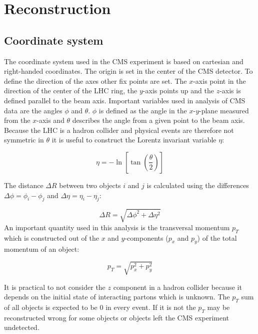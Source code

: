 \section{Reconstruction}
\subsection{Coordinate system}
	The coordinate system used in the CMS experiment is based on cartesian and right-handed coordinates. The origin is set in the center of the CMS detector. To define the direction of the axes other fix points are set. The $x$-axis point in the direction of the center of the LHC ring, the $y$-axis points up and the $z$-axis is defined parallel to the beam axis. Important variables used in analysis of CMS data are the angles $\phi$ and $\theta$. $\phi$ is defined as the angle in the $x$-$y$-plane measured from the $x$-axis and $\theta$ describes the angle from a given point to the beam axis. Because the LHC is a hadron collider and physical events are therefore not symmetric in $\theta$ it is useful to construct the Lorentz invariant variable $\eta$:
	
	\begin{equation}
	\eta = - \ln \left[\tan\left( \frac{\theta}{2}\right) \right]
	\end{equation} 

	\noindent The distance $\Delta R$ between two objects $i$ and $j$ is calculated using the differences $\Delta \phi = \phi_i - \phi_j$ and $\Delta \eta = \eta_i - \eta_j$:
	
	\begin{equation}
	\Delta R = \sqrt{\Delta \phi ^2 + \Delta \eta ^2}
	\end{equation}
	\noindent An important quantity used in this analysis is the transversal momentum $p_T$ which is constructed out of the $x$ and $y$-components ($p_x$ and $p_y$) of the total momentum of an object:
	
	\begin{equation}
	p_T = \sqrt{p_x^2 + p_y^2}
	\end{equation} 

	\noindent It is practical to not consider the $z$ component in a hadron collider because it depends on the initial state of interacting partons which is unknown. The $p_T$ sum of all objects is expected to be $0$ in every event. If it is not the $p_T$ may be reconstructed wrong for some objects or objects left the CMS experiment undetected.
